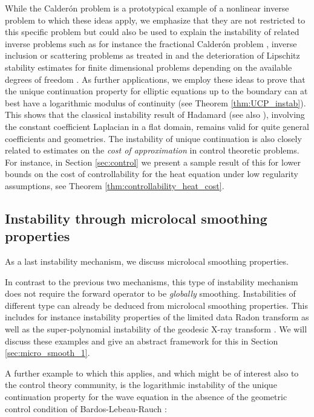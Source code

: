 \documentclass[12pt,twoside]{amsart}
\numberwithin{equation}{section}
\begin{document}
While the Calder\'on problem is a prototypical example of a nonlinear inverse problem to which these ideas apply, we emphasize that they are not restricted to this specific problem but could also be used to explain the instability of related inverse problems such as for instance the fractional Calder\'on problem \cite{RulandSalo_instability}, inverse inclusion or scattering problems as treated in \cite{DiCristoRondi} and the deterioration of Lipschitz stability estimates for finite dimensional problems depending on the available degrees of freedom \cite{R06}. 
As further applications, we employ these ideas to prove that the unique continuation property for elliptic equations up to the boundary can at best have a logarithmic modulus of continuity (see Theorem \ref{thm:UCP_instab}). This shows that the classical instability result of Hadamard \cite{Hadamard} (see also \cite{AlessandriniRondiRossetVessella}), involving the constant coefficient Laplacian in a flat domain, remains valid for quite general coefficients and geometries.
The instability of unique continuation is also closely related to estimates on the \emph{cost of approximation} in control theoretic problems. For instance, in Section \ref{sec:control} we present a sample result of this for lower bounds on the cost of controllability for the heat equation under low regularity assumptions, see Theorem \ref{thm:controllability_heat_cost}.



\subsection{Instability through microlocal smoothing properties}

\label{sec:instabIII}

As a last instability mechanism, we discuss microlocal smoothing properties.

In contrast to the previous two mechanisms, this type of instability mechanism does not require the forward operator to be \emph{globally} smoothing. Instabilities of different type can already be deduced from microlocal smoothing properties. This includes for instance instability properties of the limited data Radon transform \cite{Quinto, Quinto1} as well as the super-polynomial instability of the geodesic X-ray transform \cite{StefanovUhlmann, MSU15, HU18}. We will discuss these examples and give an abstract framework for this in Section \ref{sec:micro_smooth_1}.

A further example to which this applies, and which might be of interest also to the control theory community, is the logarithmic instability of the unique continuation property for the wave equation in the absence of the geometric control condition of Bardos-Lebeau-Rauch \cite{BardosLebeauRauch}:
\end{document}
